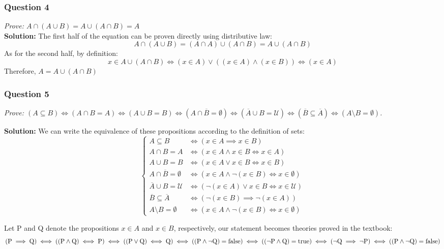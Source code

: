\documentclass[
	letterpaper, %
	11pt, %
]{CSUniSchoolLabReport}
\begin{document}
\subsubsection*{Question 4}
\textit{Prove: $A\cap \left(A \cup B\right) = A \cup \left(A \cap B\right) = A$} \\

\textbf{Solution: } The first half of the equation can be proven directly using distributive law: \[
	A\cap (A\cup B) = (A \cap A) \cup (A \cap B) = A \cup (A \cap B)
	\]
As for the second half, by definition: \[
	x \in A \cup (A \cap B)
	\iff (x \in A) \lor ((x \in A) \land (x \in B)) \iff (x \in A)
	\]
Therefore, $A = A \cup (A \cap B)$

\subsubsection*{Question 5}
\textit{Prove: $\left(A\subseteq B\right) \iff \left(A\cap B = A\right) \iff \left(A\cup B = B\right) \iff \left(A\cap\overline{B} = \emptyset\right) \iff \left(\overline{A} \cup B = \mathcal{U}\right)\iff \left(\overline{B}\subseteq \overline{A}\right) \iff \left(A\setminus B = \emptyset\right)$.}

\textbf{Solution: } We can write the equivalence of these propositions according to the definition of sets: 
\[
\left\{
\begin{aligned}
	A \subseteq B &\iff (x \in A \implies x \in B) \\
	A \cap B = A &\iff (x \in A \land x \in B \iff x \in A) \\ 
	A \cup B = B &\iff (x \in A \lor x \in B \iff x \in B) \\
	A \cap \overline{B} = \emptyset &\iff (x \in A \land \lnot(x \in B) \iff x \in \emptyset) \\
	\overline{A} \cup B = \mathcal{U} &\iff (\lnot(x \in A) \lor x \in B \iff x \in \mathcal{U}) \\
	\overline{B} \subseteq \overline{A} &\iff (\lnot(x \in B) \implies \lnot(x \in A)) \\
	A \setminus B = \emptyset &\iff (x \in A \land \lnot(x \in B) \iff x \in \emptyset)
\end{aligned}
\right.
\]

Let P and Q denote the propositions $x \in A$ and $x \in B$, respectively, our statement becomes theories proved in the textbook:
\[
	(\text{P} \implies \text{Q}) \\ 
	\iff ((\text{P} \land \text{Q}) \iff \text{P}) \\
	\iff ((\text{P} \lor \text{Q}) \iff \text{Q}) \\
	\iff ((\text{P} \land \lnot \text{Q}) = \text{false}) \\
	\iff ((\lnot \text{P} \land \text{Q}) = \text{true}) \\
	\iff (\lnot \text{Q} \implies \lnot \text{P}) \\
	\iff ((\text{P} \land \lnot \text{Q}) = \text{false}) \\
\]
\end{document}
